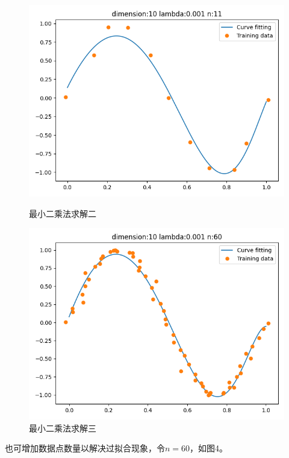 \documentclass[a4paper,11pt,UTF8]{ctexart}
\begin{document}
\begin{figure}[H]
\centering %
\begin{minipage}[b]{0.45\textwidth} %
\centering %
\includegraphics[width=1\textwidth]{1_2.png} %
\caption{最小二乘法求解二}
\end{minipage}
\begin{minipage}[b]{0.45\textwidth} %
\centering %
\includegraphics[width=1\textwidth]{1_3.png}%
\caption{最小二乘法求解三}
\end{minipage}
\end{figure}
也可增加数据点数量以解决过拟合现象，令$n=60$，如图4。
\end{document}
